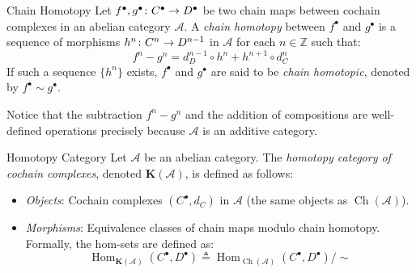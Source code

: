 \documentclass[a4paper]{article}
\begin{document}
\begin{snippetdefinition}{Chain Homotopy}
    Let \(f^\bullet, g^\bullet \colon C^\bullet \to D^\bullet\) be two chain maps between cochain complexes in an abelian category \(\mathcal A\).
    A \emph{chain homotopy} between \(f^\bullet\) and \(g^\bullet\) is a sequence of morphisms \(h^n \colon C^n \to D^{n-1}\) in \(\mathcal A\) for each \(n \in \mathbb{Z}\) such that:
    \[
        f^n - g^n = d_D^{n-1} \circ h^n + h^{n+1} \circ d_C^n
    \]
    If such a sequence \(\{h^n\}\) exists, \(f^\bullet\) and \(g^\bullet\) are said to be \emph{chain homotopic}, denoted by \(f^\bullet \sim g^\bullet\).
    
    \begin{center}
    \end{center}
\end{snippetdefinition}

Notice that the subtraction \(f^n - g^n\) and the addition of compositions are well-defined operations precisely because \(\mathcal A\) is an additive category.

\begin{snippetdefinition}{Homotopy Category}
    Let \(\mathcal A\) be an abelian category. The \emph{homotopy category of cochain complexes}, denoted \(\mathbf{K}(\mathcal A)\), is defined as follows:
    \begin{itemize}
        \item \emph{Objects}: Cochain complexes \((C^\bullet, d_C)\) in \(\mathcal A\) (the same objects as \(\operatorname{Ch}(\mathcal A)\)).
        \item \emph{Morphisms}: Equivalence classes of chain maps modulo chain homotopy. Formally, the hom-sets are defined as:
        \[
            \operatorname{Hom}_{\mathbf{K}(\mathcal A)}(C^\bullet, D^\bullet) \triangleq \operatorname{Hom}_{\operatorname{Ch}(\mathcal A)}(C^\bullet, D^\bullet) / \sim
        \]
    \end{itemize}
\end{snippetdefinition}
\end{document}
